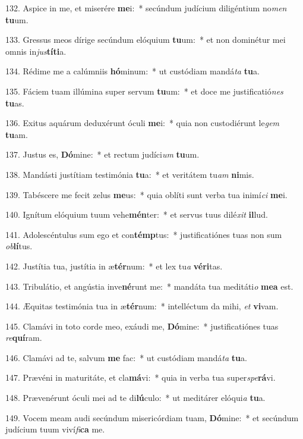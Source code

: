 132. Aspice in me, et miserére \textbf{me}i:~*  secúndum judícium diligéntium no\textit{men} \textbf{tu}um.\

133. Gressus meos dírige secúndum elóquium \textbf{tu}um:~*  et non dominétur mei omnis in\textit{jus}\textbf{tí}\textbf{ti}a.\

134. Rédime me a calúmniis \textbf{hó}minum:~*  ut custódiam mandá\textit{ta} \textbf{tu}a.\

135. Fáciem tuam illúmina super servum \textbf{tu}um:~*  et doce me justificatió\textit{nes} \textbf{tu}as.\

136. Exitus aquárum deduxérunt óculi \textbf{me}i:~*  quia non custodiérunt le\textit{gem} \textbf{tu}am.\

137. Justus es, \textbf{Dó}mine:~*  et rectum judíci\textit{um} \textbf{tu}um.\

138. Mandásti justítiam testimónia \textbf{tu}a:~*  et veritátem tu\textit{am} \textbf{ni}mis.\

139. Tabéscere me fecit zelus \textbf{me}us:~*  quia oblíti sunt verba tua inimí\textit{ci} \textbf{me}i.\

140. Ignítum elóquium tuum vehe\textbf{mén}ter:~*  et servus tuus dilé\textit{xit} \textbf{il}lud.\

141. Adolescéntulus sum ego et con\textbf{témp}tus:~*  justificatiónes tuas non sum \textit{ob}\textbf{lí}tus.\

142. Justítia tua, justítia in æ\textbf{tér}num:~*  et lex tu\textit{a} \textbf{vé}\textbf{ri}tas.\

143. Tribulátio, et angústia inve\textbf{né}runt me:~*  mandáta tua meditáti\textit{o} \textbf{me}\textbf{a} est.\

144. Æquitas testimónia tua in æ\textbf{tér}num:~*  intelléctum da mihi, \textit{et} \textbf{vi}vam.\

145. Clamávi in toto corde meo, exáudi me, \textbf{Dó}mine:~*  justificatiónes tuas \textit{re}\textbf{quí}ram.\

146. Clamávi ad te, salvum \textbf{me} fac:~*  ut custódiam mandá\textit{ta} \textbf{tu}a.\

147. Prævéni in maturitáte, et cla\textbf{má}vi:~*  quia in verba tua super\textit{spe}\textbf{rá}vi.\

148. Prævenérunt óculi mei ad te di\textbf{lú}culo:~*  ut meditárer elóqui\textit{a} \textbf{tu}a.\

149. Vocem meam audi secúndum misericórdiam tuam, \textbf{Dó}mine:~*  et secúndum judícium tuum viví\textit{fi}\textbf{ca} me.\

